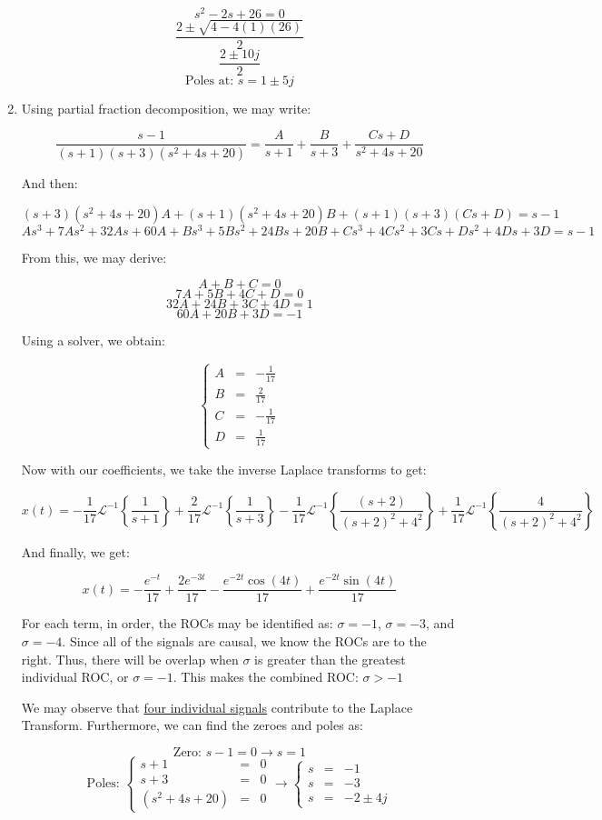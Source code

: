 \begin{enumerate}
    $$s^2-2s+26=0$$
    $$\frac{2\pm\sqrt{4-4(1)(26)}}{2}$$
    $$\frac{2\pm10j}{2}$$
    $$\boxed{\text{Poles at: }s=1\pm 5j}$$

  \item

    Using partial fraction decomposition, we may write:

    $$\frac{s-1}{(s+1)(s+3)(s^2+4s+20)}=\frac{A}{s+1}+\frac{B}{s+3}+\frac{Cs+D}{s^2+4s+20}$$

    And then:

    $$(s+3)(s^2+4s+20)A+(s+1)(s^2+4s+20)B+(s+1)(s+3)(Cs+D)=s-1$$
    $$As^3+7As^2+32As+60A+Bs^3+5Bs^2+24Bs+20B+Cs^3+4Cs^2+3Cs+Ds^2+4Ds+3D=s-1$$

    From this, we may derive:

    $$A+B+C=0$$
    $$7A+5B+4C+D=0$$
    $$32A+24B+3C+4D=1$$
    $$60A+20B+3D=-1$$

    Using a solver, we obtain:

    $$\left\{\begin{array}{lll} A&=& -\frac{1}{17}\\B&=&\frac{2}{17} \\C&=&-\frac{1}{17} \\D&=&\frac{1}{17} \end{array}$$

      Now with our coefficients, we take the inverse Laplace transforms to get:

      $$x(t)=-\frac{1}{17}\mathcal{L}^{-1}\left\{ \frac{1}{s+1} \right\}+\frac{2}{17}\mathcal{L}^{-1}\left\{ \frac{1}{s+3} \right\}-\frac{1}{17}\mathcal{L}^{-1}\left\{ \frac{(s+2)}{(s+2)^2+4^2} \right\}+\frac{1}{17}\mathcal{L}^{-1}\left\{ \frac{4}{(s+2)^2+4^2} \right\}$$

      And finally, we get:

      $$\boxed{x(t)=-\frac{e^{-t}}{17}+\frac{2e^{-3t}}{17}-\frac{e^{-2t}\cos(4t)}{17}+\frac{e^{-2t}\sin(4t)}{17}}$$

      For each term, in order, the ROCs may be identified as: $\sigma=-1$, $\sigma=-3$, and $\sigma=-4$. Since all of the signals are causal, we know the ROCs are to the right. Thus, there will be overlap when $\sigma$ is greater than the greatest individual ROC, or $\sigma=-1$. This makes the combined ROC: $\boxed{\sigma > -1}$

      We may observe that \underline{four individual signals} contribute to the Laplace Transform. Furthermore, we can find the zeroes and poles as:

      $$\boxed{\text{Zero: }s-1=0\to s=1}$$
      $$\boxed{\text{Poles: }\left\{\begin{array}{lll} s+1&=&0\\s+3&=&0\\(s^2+4s+20)&=&0\end{array}\to\left\{\begin{array}{lll} s&=&-1\\s&=&-3\\s&=&-2\pm4j\end{array}}$$


\end{enumerate}
